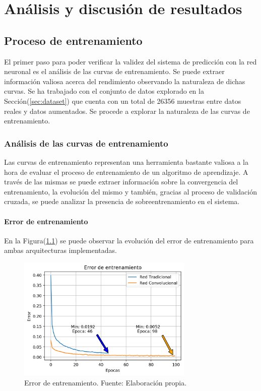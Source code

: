 \chapter{Análisis y discusión de resultados}
\label{ch:resultados}
\section{Proceso de entrenamiento}\label{sec:analisistrain}
El primer paso para poder verificar la validez del sistema de predicción con la red neuronal es el análisis 
de las curvas de entrenamiento. Se puede extraer información valiosa acerca del rendimiento observando 
la naturaleza de dichas curvas. Se ha trabajado con el conjunto de datos explorado en la Sección(\ref{sec:dataset}) 
que cuenta con un total de 26356 muestras entre datos reales y datos aumentados. Se procede a explorar la naturaleza 
de las curvas de entrenamiento.
    
    \subsection{Análisis de las curvas de entrenamiento}

    Las curvas de entrenamiento representan una herramienta bastante valiosa a la hora de evaluar el proceso de entrenamiento 
    de un algoritmo de aprendizaje. A través de las mismas se puede extraer información sobre la convergencia del entrenamiento, 
    la evolución del mismo y también, gracias al proceso de validación cruzada, se puede analizar la presencia de sobreentrenamiento 
    en el sistema.

        \subsubsection{Error de entrenamiento}

        En la Figura(\ref{fig:trainloss}) se puede observar la evolución del error de entrenamiento para ambas arquitecturas implementadas. 
        \begin{figure}[!ht] 
            \centering
            \includegraphics[width=0.75\textwidth]{img/trainloss}
            \caption[Error de entrenamiento]{Error de entrenamiento. Fuente: Elaboración propia. }
            \label{fig:trainloss}
        \end{figure}

